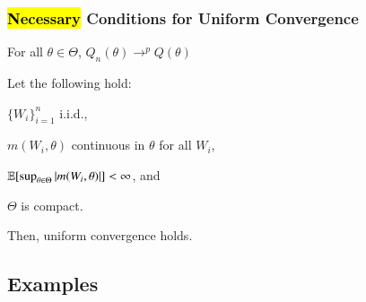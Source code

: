 \documentclass[../main.tex]{subfiles}
\begin{document}
\subsubsection{\hl{Necessary} Conditions for Uniform Convergence}
\begin{ass}\label{ass:A21}
For all $\theta \in \Theta$, $Q_n(\theta) \to^p Q(\theta)$
\end{ass}


\begin{lem}{}{}
Let the following hold:
\begin{enumerate*}[(i)]
	\item $\{W_i\}_{i=1}^{n}$ i.i.d.,
	\item $m(W_i, \theta)$ continuous in $\theta$ for all $W_i$,
	\item $\operatorname{\mathbb{E}}[\sup_{\theta \in \Theta} |m(W_i, \theta)|] < \infty$, and
	\item $\Theta$ is compact.
\end{enumerate*}
Then, uniform convergence holds.

\end{lem}
\subsection{Examples}
\end{document}
